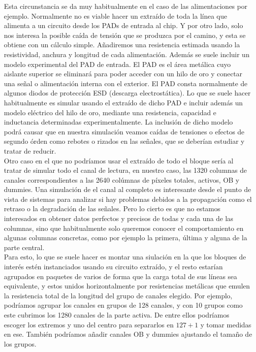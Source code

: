 Esta circunstancia se da muy habitualmente en el caso de las alimentaciones por ejemplo.
Normalmente no es viable hacer un extraído de toda la línea que alimenta a un circuito
desde los PADs de entrada al chip. Y por otro lado, solo nos interesa la posible
caída de tensión que se produzca por el camino, y esta se obtiene con un cálculo
simple. Añadiremos una resistencia estimada usando la resistividad, anchura y longitud
de cada alimentación. Además se suele incluir un modelo experimental del PAD de entrada.
El PAD es el área metálica cuyo aislante superior se eliminará para poder acceder
con un hilo de oro y conectar una señal o alimentación interna con el exterior.
El PAD consta normalmente de algunos diodos de protección ESD (descarga electrostática).
Lo que se suele hacer habitualmente es simular usando el extraído de dicho PAD e
incluir además un modelo eléctrico del hilo de oro, mediante una resistencia,
capacidad e inductancia determinadas experimentalmente. La inclusión de dicho modelo
podrá causar que en nuestra simulación veamos caídas de tensiones o efectos de
segundo órden como rebotes o rizados en las señales, que se deberían estudiar y
tratar de reducir.\\

Otro caso en el que no podríamos usar el extraído de todo el bloque sería al tratar
de simular todo el canal de lectura, en nuestro caso, las 1320 columnas de canales
correspondientes a las 2640 colúmnas de píxeles totales, activos, OB y dummies.
Una simulación de el canal al completo es interesante desde el punto de vista de
sistemas para analizar si hay problemas debidos a la propagación como el retraso
o la degradación de las señales. Pero lo cierto es que no estamos interesados
en obtener datos perfectos y precisos de todas y cada una de las columnas, sino que
habitualmente solo queremos conocer el comportamiento en algunas columnas concretas,
como por ejemplo la primera, última y alguna de la parte central.\\

Para esto, lo que se suele hacer es montar una siulación en la que los bloques
de interés estén instanciados usando su circuito extraído, y el resto estarían
agrupados en paquetes de varios de forma que la carga total de sus líneas sea
equivalente, y estos unidos horizontalmente por resistencias metálicas que
emulen la resistencia total de la longitud del grupo de canales elegido. Por
ejemplo, podríamos agrupar los canales en grupos de 128 canales, y con 10 grupos
como este cubrimos los 1280 canales de la parte activa. De entre ellos podríamos
escoger los extremos y uno del centro para separarlos en $127 + 1$ y tomar medidas
en ese. También podríamos añadir canales OB y dummies ajustando el tamaño de los
grupos.\\

